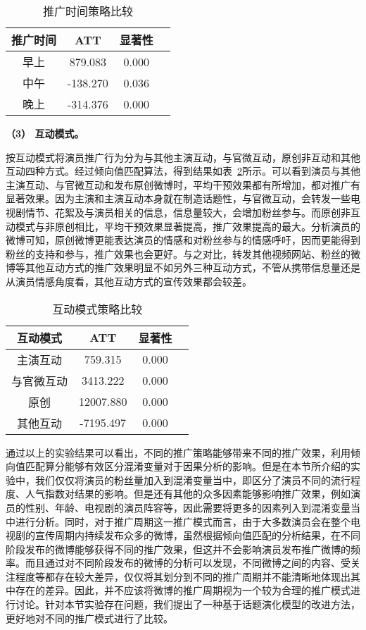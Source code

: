 \begin{table}[h]
\centering
\caption{推广时间策略比较}
\label{r2}
\begin{tabular}{|c|c|c|c|} \hline
推广时间& ATT & 显著性\\ \hline
早上 & 879.083& 0.000\\ \hline
中午 & -138.270& 0.036\\ \hline
晚上 & -314.376 & 0.000\\ 
\hline\end{tabular}

\end{table}

\textbf{（3） 互动模式。}

按互动模式将演员推广行为分为与其他主演互动，与官微互动，原创非互动和其他互动四种方式。经过倾向值匹配算法，得到结果如表~\ref{r3}所示。可以看到演员与其他主演互动、与官微互动和发布原创微博时，平均干预效果都有所增加，都对推广有显著效果。因为主演和主演互动本身就在制造话题性，与官微互动，会转发一些电视剧情节、花絮及与演员相关的信息，信息量较大，会增加粉丝参与。而原创非互动模式与非原创相比，平均干预效果显著提高，推广效果提高的最大。分析演员的微博可知，原创微博更能表达演员的情感和对粉丝参与的情感呼吁，因而更能得到粉丝的支持和参与，推广效果也会更好。与之对比，转发其他视频网站、粉丝的微博等其他互动方式的推广效果明显不如另外三种互动方式，不管从携带信息量还是从演员情感角度看，其他互动方式的宣传效果都会较差。

\begin{table}[h]
\centering
\caption{互动模式策略比较}
\label{r3}
\begin{tabular}{|c|c|c|c|} \hline
互动模式& ATT & 显著性\\ \hline
主演互动  & 759.315& 0.000\\ \hline
与官微互动 & 3413.222& 0.000\\ \hline
原创  & 12007.880& 0.000\\ \hline
其他互动 & -7195.497 & 0.000\\ 
\hline\end{tabular}
\end{table}

通过以上的实验结果可以看出，不同的推广策略能够带来不同的推广效果，利用倾向值匹配算分能够有效区分混淆变量对于因果分析的影响。但是在本节所介绍的实验中，我们仅仅将演员的粉丝量加入到混淆变量当中，即区分了演员不同的流行程度、人气指数对结果的影响。但是还有其他的众多因素能够影响推广效果，例如演员的性别、年龄、电视剧的演员阵容等，因此需要将更多的因素列入到混淆变量当中进行分析。同时，对于推广周期这一推广模式而言，由于大多数演员会在整个电视剧的宣传周期内持续发布众多的微博，虽然根据倾向值匹配的分析结果，在不同阶段发布的微博能够获得不同的推广效果，但这并不会影响演员发布推广微博的频率。而且通过对不同阶段发布的微博的分析可以发现，不同微博之间的内容、受关注程度等都存在较大差异，仅仅将其划分到不同的推广周期并不能清晰地体现出其中存在的差异。因此，并不应该将微博的推广周期视为一个较为合理的推广模式进行讨论。针对本节实验存在问题，我们提出了一种基于话题演化模型的改进方法，更好地对不同的推广模式进行了比较。

